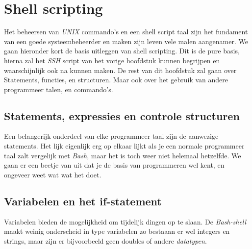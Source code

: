 %
%
%
%

\chapter{Shell scripting}
Het beheersen van \emph{UNIX} commando's en een shell script taal zijn het fundament van een goede systeembeheerder en maken zijn leven vele malen aangenamer. We gaan hieronder kort de basis uitleggen van shell scripting. Dit is de pure basis, hierna zal het \emph{SSH} script van het vorige hoofdstuk kunnen begrijpen en waarschijnlijk ook na kunnen maken. De rest van dit hoofdstuk zal gaan over Statements, functies, en structuren. Maar ook over het gebruik van andere programmeer talen, en commando's.

\section{Statements, expressies en controle structuren}
Een belangerijk onderdeel van elke programmeer taal zijn de aanwezige statements. Het lijk eigenlijk erg op elkaar lijkt als je een normale programmeer taal zalt vergelijk met \emph{Bash}, maar het is toch weer niet helemaal hetzelfde. We gaan er een beetje van uit dat je de basis van programmeren wel kent, en ongeveer weet wat wat het doet. 

\section{Variabelen en het if-statement}
Variabelen bieden de mogelijkheid om tijdelijk dingen op te slaan. De \emph{Bash-shell} maakt weinig onderscheid in type variabelen zo bestaaan er wel integers en strings, maar zijn er bijvoorbeeld geen doubles of andere \emph{datatypen}.

